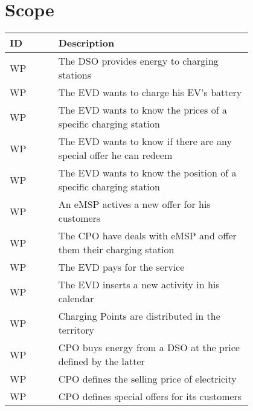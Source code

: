 \section{Scope}
\label{sec:scope}
\setcounter{wp}{1}
\newcommand{\cwp}{\thewp\stepcounter{wp}}
\begin{table}[H]
    \begin{center}
        \begin{tabular}{ |l|p{0.8\linewidth}| }
            \hline
            \textbf{ID} & \textbf{Description}                                               \\
            \hline
            WP\cwp      & The DSO provides energy to charging stations                       \\
            \hline
            WP\cwp      & The EVD wants to charge his EV's battery                           \\
            \hline
            WP\cwp      & The EVD wants to know the prices of a specific charging station    \\
            \hline
            WP\cwp      & The EVD wants to know if there are any special offer he can redeem \\
            \hline
            WP\cwp      & The EVD wants to know the position of a specific charging station  \\
            \hline
            WP\cwp      & An eMSP actives a new offer for his customers                      \\
            \hline
            WP\cwp      & The CPO have deals with eMSP and offer them their charging station \\
            \hline
            WP\cwp      & The EVD pays for the service                                       \\
            \hline
            WP\cwp      & The EVD inserts a new activity in his calendar                     \\
            \hline
            WP\cwp      & Charging Points are distributed in the territory                   \\
            \hline
            WP\cwp      & CPO buys energy from a DSO at the price defined by the latter      \\
            \hline
            WP\cwp      & CPO defines the selling price of electricity                       \\
            \hline
            WP\cwp      & CPO defines special offers for its customers                       \\

\end{tabular}
\end{center}
\end{table}
